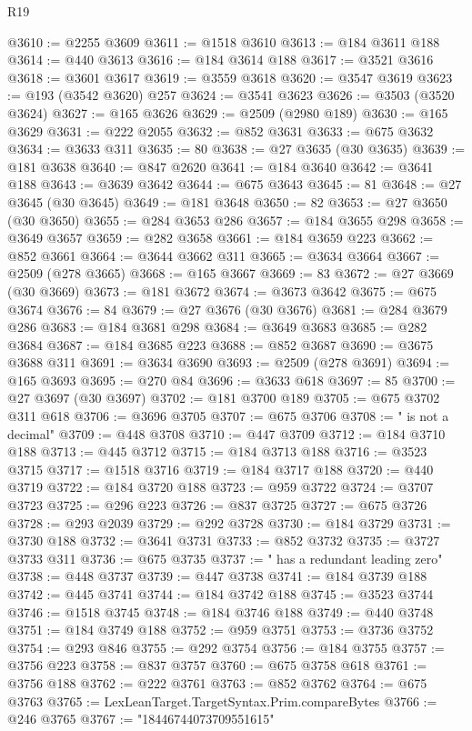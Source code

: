 \begin{lexlean}{R19}
\begin{coremodule}
@3610 := @2255 @3609
@3611 := @1518 @3610
@3613 := @184 @3611 @188
@3614 := @440 @3613
@3616 := @184 @3614 @188
@3617 := @3521 @3616
@3618 := @3601 @3617
@3619 := @3559 @3618
@3620 := @3547 @3619
@3623 := @193 (@3542 @3620) @257
@3624 := @3541 @3623
@3626 := @3503 (@3520 @3624)
@3627 := @165 @3626
@3629 := @2509 (@2980 @189)
@3630 := @165 @3629
@3631 := @222 @2055
@3632 := @852 @3631
@3633 := @675 @3632
@3634 := @3633 @311
@3635 := 80
@3638 := @27 @3635 (@30 @3635)
@3639 := @181 @3638
@3640 := @847 @2620
@3641 := @184 @3640
@3642 := @3641 @188
@3643 := @3639 @3642
@3644 := @675 @3643
@3645 := 81
@3648 := @27 @3645 (@30 @3645)
@3649 := @181 @3648
@3650 := 82
@3653 := @27 @3650 (@30 @3650)
@3655 := @284 @3653 @286
@3657 := @184 @3655 @298
@3658 := @3649 @3657
@3659 := @282 @3658
@3661 := @184 @3659 @223
@3662 := @852 @3661
@3664 := @3644 @3662 @311
@3665 := @3634 @3664
@3667 := @2509 (@278 @3665)
@3668 := @165 @3667
@3669 := 83
@3672 := @27 @3669 (@30 @3669)
@3673 := @181 @3672
@3674 := @3673 @3642
@3675 := @675 @3674
@3676 := 84
@3679 := @27 @3676 (@30 @3676)
@3681 := @284 @3679 @286
@3683 := @184 @3681 @298
@3684 := @3649 @3683
@3685 := @282 @3684
@3687 := @184 @3685 @223
@3688 := @852 @3687
@3690 := @3675 @3688 @311
@3691 := @3634 @3690
@3693 := @2509 (@278 @3691)
@3694 := @165 @3693
@3695 := @270 @84
@3696 := @3633 @618
@3697 := 85
@3700 := @27 @3697 (@30 @3697)
@3702 := @181 @3700 @189
@3705 := @675 @3702 @311 @618
@3706 := @3696 @3705
@3707 := @675 @3706
@3708 := " is not a decimal"
@3709 := @448 @3708
@3710 := @447 @3709
@3712 := @184 @3710 @188
@3713 := @445 @3712
@3715 := @184 @3713 @188
@3716 := @3523 @3715
@3717 := @1518 @3716
@3719 := @184 @3717 @188
@3720 := @440 @3719
@3722 := @184 @3720 @188
@3723 := @959 @3722
@3724 := @3707 @3723
@3725 := @296 @223
@3726 := @837 @3725
@3727 := @675 @3726
@3728 := @293 @2039
@3729 := @292 @3728
@3730 := @184 @3729
@3731 := @3730 @188
@3732 := @3641 @3731
@3733 := @852 @3732
@3735 := @3727 @3733 @311
@3736 := @675 @3735
@3737 := " has a redundant leading zero"
@3738 := @448 @3737
@3739 := @447 @3738
@3741 := @184 @3739 @188
@3742 := @445 @3741
@3744 := @184 @3742 @188
@3745 := @3523 @3744
@3746 := @1518 @3745
@3748 := @184 @3746 @188
@3749 := @440 @3748
@3751 := @184 @3749 @188
@3752 := @959 @3751
@3753 := @3736 @3752
@3754 := @293 @846
@3755 := @292 @3754
@3756 := @184 @3755
@3757 := @3756 @223
@3758 := @837 @3757
@3760 := @675 @3758 @618
@3761 := @3756 @188
@3762 := @222 @3761
@3763 := @852 @3762
@3764 := @675 @3763
@3765 := LexLeanTarget.TargetSyntax.Prim.compareBytes
@3766 := @246 @3765
@3767 := "18446744073709551615"

\end{coremodule}
\end{lexlean}
